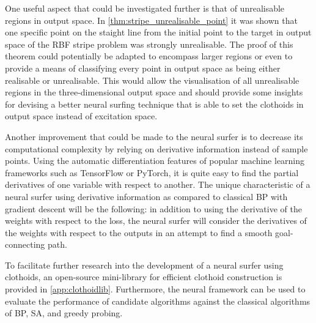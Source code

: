 One useful aspect that could be investigated further is that of unrealisable regions in output space.
In \ref{thm:stripe_unrealisable_point} it was shown that one specific point on the staight line from the initial point to the target in output space of the RBF stripe problem was strongly unrealisable.
The proof of this theorem could potentially be adapted to encompass larger regions or even to provide a means of classifying every point in output space as being either realisable or unrealisable.
This would allow the visualisation of all unrealisable regions in the three-dimensional output space and should provide some insights for devising a better neural surfing technique that is able to set the clothoids in output space instead of excitation space.

Another improvement that could be made to the neural surfer is to decrease its computational complexity by relying on derivative information instead of sample points.
Using the automatic differentiation features of popular machine learning frameworks such as TensorFlow or PyTorch, it is quite easy to find the partial derivatives of one variable with respect to another.
The unique characteristic of a neural surfer using derivative information as compared to classical BP with gradient descent will be the following:
in addition to using the derivative of the weights with respect to the loss, the neural surfer will consider the derivatives of the weights with respect to the outputs in an attempt to find a smooth goal-connecting path.

To facilitate further research into the development of a neural surfer using clothoids, an open-source mini-library for efficient clothoid construction is provided in \ref{app:clothoidlib}.
Furthermore, the neural framework can be used to evaluate the performance of candidate algorithms against the classical algorithms of BP, SA, and greedy probing.
